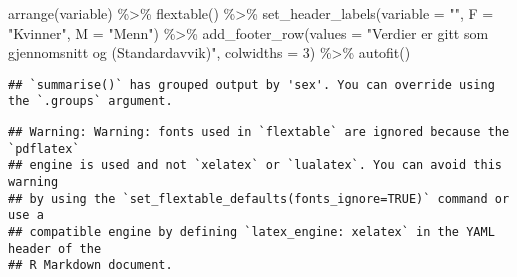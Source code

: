 \documentclass[
]{article}
\newenvironment{Shaded}{\begin{snugshade}}{\end{snugshade}}
\newcommand{\AttributeTok}[1]{\textcolor[rgb]{0.77,0.63,0.00}{#1}}
\newcommand{\DecValTok}[1]{\textcolor[rgb]{0.00,0.00,0.81}{#1}}
\newcommand{\FunctionTok}[1]{\textcolor[rgb]{0.00,0.00,0.00}{#1}}
\newcommand{\NormalTok}[1]{#1}
\newcommand{\SpecialCharTok}[1]{\textcolor[rgb]{0.00,0.00,0.00}{#1}}
\newcommand{\StringTok}[1]{\textcolor[rgb]{0.31,0.60,0.02}{#1}}
\begin{document}
\begin{Shaded}
\begin{Highlighting}[]
  \FunctionTok{arrange}\NormalTok{(variable) }\SpecialCharTok{\%\textgreater{}\%} 
   \FunctionTok{flextable}\NormalTok{()  }\SpecialCharTok{\%\textgreater{}\%}
   \FunctionTok{set\_header\_labels}\NormalTok{(}\AttributeTok{variable =} \StringTok{""}\NormalTok{,}
                    \AttributeTok{F =} \StringTok{"Kvinner"}\NormalTok{, }\AttributeTok{M =} \StringTok{"Menn"}\NormalTok{) }\SpecialCharTok{\%\textgreater{}\%}
  \FunctionTok{add\_footer\_row}\NormalTok{(}\AttributeTok{values =} \StringTok{"Verdier er gitt som gjennomsnitt og (Standardavvik)"}\NormalTok{, }\AttributeTok{colwidths =} \DecValTok{3}\NormalTok{) }\SpecialCharTok{\%\textgreater{}\%}
   \FunctionTok{autofit}\NormalTok{()}
\end{Highlighting}
\end{Shaded}

\begin{verbatim}
## `summarise()` has grouped output by 'sex'. You can override using the `.groups` argument.
\end{verbatim}

\begin{verbatim}
## Warning: Warning: fonts used in `flextable` are ignored because the `pdflatex`
## engine is used and not `xelatex` or `lualatex`. You can avoid this warning
## by using the `set_flextable_defaults(fonts_ignore=TRUE)` command or use a
## compatible engine by defining `latex_engine: xelatex` in the YAML header of the
## R Markdown document.
\end{verbatim}

\providecommand{\docline}[3]{\noalign{\global\setlength{\arrayrulewidth}{#1}}\arrayrulecolor[HTML]{#2}\cline{#3}}

\setlength{\tabcolsep}{2pt}

\renewcommand*{\arraystretch}{1.5}
\end{document}
